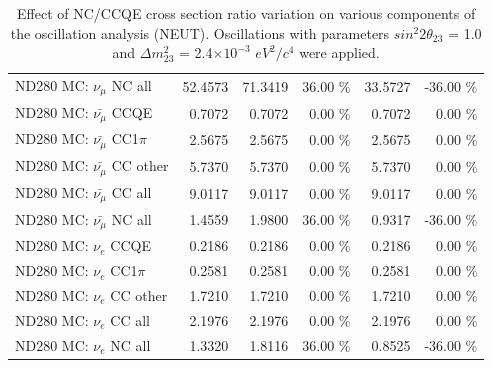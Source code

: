 \begin{table}
\begin{tabular}{| l | r | r  r | r  r |}
                                          ND280 MC: $\nu_{\mu}$ NC all &         52.4573 &         71.3419 & 36.00 \%  &         33.5727 & -36.00 \%  \\ 
                                      ND280 MC: $\bar{\nu_{\mu}}$ CCQE &          0.7072 &          0.7072 &  0.00 \%  &          0.7072 &  0.00 \%  \\ 
                                  ND280 MC: $\bar{\nu_{\mu}}$ CC1$\pi$ &          2.5675 &          2.5675 &  0.00 \%  &          2.5675 &  0.00 \%  \\ 
                                  ND280 MC: $\bar{\nu_{\mu}}$ CC other &          5.7370 &          5.7370 &  0.00 \%  &          5.7370 &  0.00 \%  \\ 
                                    ND280 MC: $\bar{\nu_{\mu}}$ CC all &          9.0117 &          9.0117 &  0.00 \%  &          9.0117 &  0.00 \%  \\ 
                                    ND280 MC: $\bar{\nu_{\mu}}$ NC all &          1.4559 &          1.9800 & 36.00 \%  &          0.9317 & -36.00 \%  \\ 
                                              ND280 MC: $\nu_{e}$ CCQE &          0.2186 &          0.2186 &  0.00 \%  &          0.2186 &  0.00 \%  \\ 
                                          ND280 MC: $\nu_{e}$ CC1$\pi$ &          0.2581 &          0.2581 &  0.00 \%  &          0.2581 &  0.00 \%  \\ 
                                          ND280 MC: $\nu_{e}$ CC other &          1.7210 &          1.7210 &  0.00 \%  &          1.7210 &  0.00 \%  \\ 
                                            ND280 MC: $\nu_{e}$ CC all &          2.1976 &          2.1976 &  0.00 \%  &          2.1976 &  0.00 \%  \\ 
                                            ND280 MC: $\nu_{e}$ NC all &          1.3320 &          1.8116 & 36.00 \%  &          0.8525 & -36.00 \%  \\ 
\hline
\end{tabular}
\caption{ 
  Effect of NC/CCQE cross section ratio variation
  on various components of the oscillation analysis (NEUT).
  Oscillations with parameters $sin^{2}2\theta_{23}$ = 1.0 and $\Delta m^{2}_{23}$ = 2.4$\times10^{-3}$ $eV^{2}/c^{4}$ were applied.  
}
\label{tab:neut_xsec_nc_to_ccqe}
\end{table}

%
%
%
%


